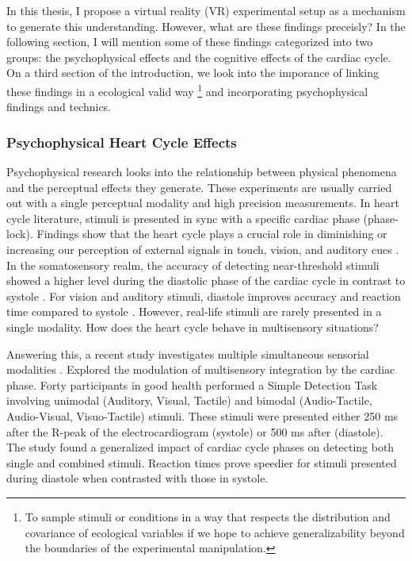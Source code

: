 \documentclass[12pt,oneside,openright]{report}
\begin{document}
In this thesis, I propose a virtual reality (VR) experimental setup as a mechanism to generate this understanding. However, what are these findings preceisly? In the following section, I will mention some of these findings categorized into two groups: the psychophysical effects and the cognitive effects of the cardiac cycle. On a third section of the introduction, we look into the imporance of linking these findings in a ecological valid way \footnote{To sample stimuli or conditions in a way that respects the distribution and covariance of ecological variables if we hope to achieve generalizability beyond the boundaries of the experimental manipulation.\parencite{NASTASE2020117254}} and incorporating psychophysical findings and technics.

\subsubsection*{Psychophysical Heart Cycle Effects}

Psychophysical research looks into the relationship between physical phenomena and the perceptual effects they generate. These experiments are usually carried out with a single perceptual modality and high precision measurements. In heart cycle literature, stimuli is presented in sync with a specific cardiac phase (phase-lock). Findings show that the heart cycle plays a crucial role in diminishing or increasing our perception of external signals in touch, vision, and auditory cues \parencite{SALTAFOSSI2023108642}. In the somatosensory realm, the accuracy of detecting near-threshold stimuli showed a higher level during the diastolic phase of the cardiac cycle in contrast to systole \parencite{esra_p, AL2021118247, Grund643, motyka}. For vision and auditory stimuli, diastole improves accuracy and reaction time compared to systole \parencite{SALTAFOSSI2023108642}. However, real-life stimuli are rarely presented in a single modality. How does the heart cycle behave in multisensory situations?

Answering this, a recent study investigates multiple simultaneous sensorial modalities \parencite{SALTAFOSSI2023108642}. Explored the modulation of multisensory integration by the cardiac phase. Forty participants in good health performed a Simple Detection Task involving unimodal (Auditory, Visual, Tactile) and bimodal (Audio-Tactile, Audio-Visual, Visuo-Tactile) stimuli. These stimuli were presented either 250 ms after the R-peak of the electrocardiogram (systole) or 500 ms after (diastole). The study found a generalized impact of cardiac cycle phases on detecting both single and combined stimuli. Reaction times prove speedier for stimuli presented during diastole when contrasted with those in systole.
\end{document}
